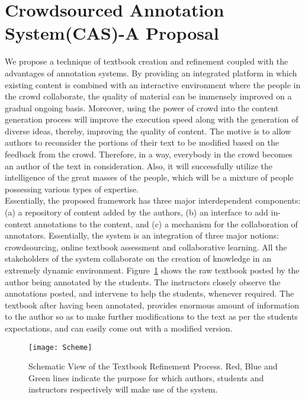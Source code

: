 \documentclass{llncs}
\begin{document}
\section{Crowdsourced Annotation System(CAS)-A Proposal}\label{sec:CAS}
We propose a technique of textbook creation and refinement coupled with the advantages of annotation systems. By providing an integrated platform in which existing content is combined with an interactive environment where the people in the crowd collaborate, the quality of material can be immensely improved on a gradual ongoing basis. Moreover, using the power of crowd into the content generation process will improve the execution speed along with the generation of diverse ideas, thereby, improving the quality of content. The motive is to allow authors to reconsider the portions of their text to be modified based on the feedback from the crowd. Therefore, in a way, everybody in the crowd becomes an author of the text in consideration. Also, it will successfully utilize the intelligence of the great masses of the people, which will be a mixture of people possessing various types of expertise.\\
Essentially, the proposed framework has three major interdependent components: (a) a repository of content added by the authors, (b) an interface to add in-context annotations to the content, and (c) a mechanism for the collaboration of annotators. Essentially, the system is an integration of three major notions: crowdsourcing, online textbook assessment and collaborative learning. All the stakeholders of the system collaborate on the creation of knowledge in an extremely dynamic environment. Figure~\ref{fig:Scheme} shows the raw textbook posted by the author being annotated by the students. The instructors closely observe the annotations posted, and intervene to help the students, whenever required. The textbook after having been annotated, provides enormous amount of information to the author so as to make further modifications to the text as per the students expectations, and can easily come out with a modified version.\\
\begin{figure}
\centering
\texttt{[image: Scheme]}
\caption{Schematic View of the Textbook Refinement Process. Red, Blue and Green lines indicate the purpose for which authors, students and instructors respectively will make use of the system.}
\label{fig:Scheme}
\end{figure}
\end{document}
